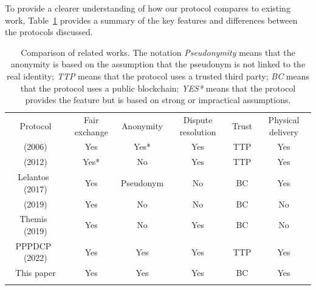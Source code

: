 \documentclass[pdftex,twocolumn,epjc3]{svjour3}
\begin{document}
To provide a clearer understanding of how our protocol compares to existing work, Table~\ref{tab:comparison} provides a summary of the key features and differences between the protocols discussed.

\begin{table}
\centering
\newcommand{\YES}{\cellcolor{green!50}Yes}
\newcommand{\YESBUT}{\cellcolor{green!25}Yes*}
\newcommand{\ID}{\cellcolor{green!25}Identity}
\newcommand{\PSEUDO}{\cellcolor{green!35}Pseudonym}
\newcommand{\ANON}{\cellcolor{green!50}Anonymity}
\newcommand{\NO}{\cellcolor{red!50}No}
\newcommand{\TTP}{\cellcolor{red!50}TTP}
\newcommand{\BC}{\cellcolor{green!50}BC}
\caption{Comparison of related works. The notation \textit{Pseudonymity} means that the anonymity is based on the assumption that the pseudonym is not linked to the real identity; \textit{TTP} means that the protocol uses a trusted third party; \textit{BC} means that the protocol uses a public blockchain; \textit{YES*} means that the protocol provides the feature but is based on strong or impractical assumptions.}
\label{tab:comparison}
\setlength{\tabcolsep}{3pt}

\begin{tabular}{cccccc}

\noalign{\smallskip}\hline\noalign{\smallskip}
Protocol & Fair exchange & Anonymity & Dispute resolution & Trust & Physical delivery \\
\noalign{\smallskip}\hline\noalign{\smallskip}
\cite{zhangPracticalFairExchangeEPayment2006} (2006) & \YES & \YESBUT & \YES & \TTP & \YES \\
\cite{mohammedalarajFairnessPhysicalProducts2012} (2012) & \YESBUT & \NO & \YES & \TTP & \YES \\
Lelantos~\cite{altawyLelantosBlockchainBasedAnonymous2017} (2017) & \YES & \PSEUDO & \NO & \BC & \YES \\
\cite{hinarejosSolutionSecureCertified2019} (2019) & \YES & \NO & \NO & \BC & \NO \\
Themis~\cite{mengThemisDecentralizedEscrow2019} (2019) & \YES & \NO & \YES & \BC & \NO \\
PPPDCP~\cite{birjoveanuTwoPartyECommerceProtocols2022} (2022) & \YES & \YES & \YES & \TTP & \YES \\
This paper & \YES & \YES & \YES & \BC & \YES \\
\noalign{\smallskip}\hline

\end{tabular}

\end{table}
\end{document}
